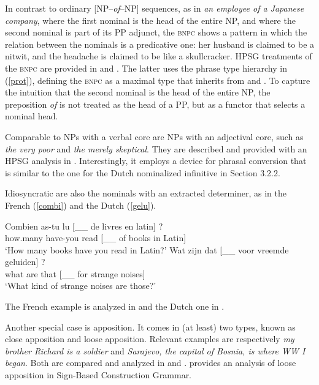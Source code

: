 \documentclass[output=paper
                ,modfonts
                ,nonflat
	        ,collection
	        ,collectionchapter
	        ,collectiontoclongg
 	        ,biblatex
                ,babelshorthands
                ,newtxmath
                ,draftmode
                ,colorlinks, citecolor=brown
]{./langsci/langscibook}
\begin{document}
\noindent
In contrast to ordinary [NP--\emph{of}--NP] sequences, 
as in \emph{an employee of a Japanese company}, where the 
first nominal is the head of the entire NP, and where the second 
nominal is part of its PP adjunct, the \textsc{bnpc} shows a pattern
in which the relation between the nominals is a predicative one: 
her husband is claimed to be a nitwit, and the headache is claimed to be 
like a skullcracker. HPSG treatments of the \textsc{bnpc} are provided in
\citet{KimSells14} and \citet{VanEynde18}. The latter uses 
the phrase type hierarchy in (\ref{prot}), defining the \textsc{bnpc} as 
a maximal type that inherits from  and 
. To capture the intuition that the second
nominal is the head of the entire NP, the preposition \emph{of} is 
not treated as the head of a PP, but as a functor that selects 
a nominal head. 

Comparable to NPs with a verbal core are NPs with an adjectival core,
such as \emph{the very poor} and \emph{the merely skeptical}. They are  
described and provided with an HPSG analysis in \citet{ArnoldSpencer2015}.
Interestingly, it employs a device for phrasal conversion that is similar to 
the one for the Dutch nominalized infinitive in Section 3.2.2. 

Idiosyncratic are also the nominals with an extracted determiner, as in 
the French (\ref{combi}) and the Dutch (\ref{gelu}). 

\begin{exe} 
\ex\label{combi}  
\gll   Combien as-tu lu [\_\_ de livres en latin] ?    \\
       how.many have-you read [\_\_ of books in Latin] \\ 
\trans `How many books have you read in Latin?' 
\ex\label{gelu}
\gll   Wat zijn dat [\_\_ voor vreemde geluiden] ? \\
       what are that [\_\_ for strange noises]     \\ 
\trans `What kind of strange noises are those?'  
\end{exe} 

\noindent
The French example is analyzed in \citet[20--21]{Abeilleetal04} and the Dutch one in 
\citet[47--50]{VanEynde04}. 

Another special case is apposition. It comes in (at least) two types, known as 
close apposition and loose apposition. Relevant examples are respectively 
\emph{my brother Richard is a soldier} and \emph{Sarajevo, the capital of Bosnia, is where WW I began}.
Both are compared and analyzed in \citet{Kim12} and \citet{Kim14}. 
\citet{VanEyndeKim16} provides an analysis of loose apposition in
Sign-Based Construction Grammar. 
\end{document}
